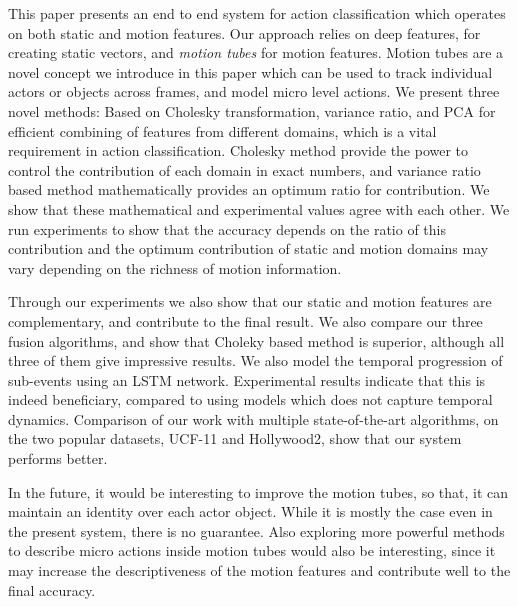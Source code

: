 This paper presents an end to end system for action classification which operates
on both static and motion features. Our approach relies on deep features,
for creating static vectors, and \textit{motion tubes} for motion features.
Motion tubes are a novel concept we introduce in this paper which can be
used to track individual actors or objects across frames, and model micro level actions.
We present three novel methods: Based on Cholesky transformation, variance ratio, and PCA for efficient combining of features
from different domains, which is a vital requirement in action classification.
Cholesky method provide the power to control the contribution of each domain in exact numbers, and
variance ratio based method mathematically provides an optimum ratio for contribution. We show that these mathematical
and experimental values agree with each other. We run experiments to show that the accuracy depends on the ratio of this contribution and the optimum contribution of
static and motion domains may vary depending on the richness of motion information.

Through our experiments we also show that our static and motion features are complementary,
and contribute to the final result. We also compare our three fusion algorithms, and
show that Choleky based method is superior, although all three of them give impressive results. We also model the temporal progression of sub-events using an LSTM network. Experimental
results indicate that this is indeed beneficiary, compared to using models which does not capture temporal dynamics. Comparison of our work with multiple state-of-the-art algorithms, on the two popular datasets, UCF-11 and Hollywood2, show that our system performs better.


In the future, it would be interesting to improve the motion tubes, so that, it can maintain an identity over each actor object.
While it is mostly the case even in the present system, there is no guarantee. 
Also exploring more powerful methods to describe micro actions inside motion tubes would also be interesting, since it may increase the descriptiveness of the motion features and
contribute well to the final accuracy.
